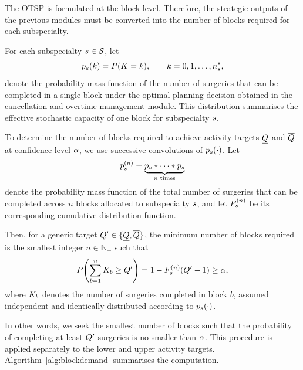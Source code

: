 The OTSP is formulated at the block level. 
Therefore, the strategic outputs of the previous modules must be converted into the number of blocks required for each subspecialty.

For each subspecialty $s \in \mathcal{S}$, let
\[
p_{s}(k)=P(K = k), \qquad k=0,1,\dots,n^*_{s},
\]
denote the probability mass function of the number of surgeries that can be completed in a single block under the optimal planning decision obtained in the cancellation and overtime management module. 
This distribution summarises the effective stochastic capacity of one block for subspecialty $s$.

To determine the number of blocks required to achieve activity targets $\underline{Q}$ and $\overline{Q}$ at confidence level $\alpha$, we use successive convolutions of $p_{s}(\cdot)$. 
Let
\[
p_{s}^{(n)} = \underbrace{p_{s} \ast \cdots \ast p_{s}}_{n \text{ times}}
\]
denote the probability mass function of the total number of surgeries that can be completed across $n$ blocks allocated to subspecialty $s$, and let $F_{s}^{(n)}$ be its corresponding cumulative distribution function.

Then, for a generic target ${Q'} \in \{\underline{Q},\overline{Q}\}$, the minimum number of blocks required is the smallest integer $n \in \mathbb{N}_{+}$ such that
\begin{equation}\label{eq:block_requirement}
P\!\left(\sum_{b=1}^{n} K_b \geq {Q'}\right)
=
1 - F_{s}^{(n)}({Q'} - 1)
\geq
\alpha,
\end{equation}
where $K_b$ denotes the number of surgeries completed in block $b$, assumed independent and identically distributed according to $p_{s}(\cdot)$.

In other words, we seek the smallest number of blocks such that the probability of completing at least ${Q'}$ surgeries is no smaller than $\alpha$. 
This procedure is applied separately to the lower and upper activity targets. Algorithm~\ref{alg:blockdemand} summarises the computation.

